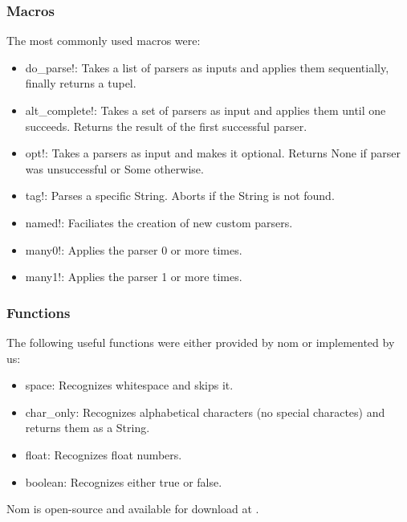 \documentclass[11pt,singlecolumn]{scrartcl}
\begin{document}
\subsubsection{Macros}
The most commonly used macros were:
\begin{itemize} 
\item do\_parse!: Takes a list of parsers as inputs and applies them sequentially, finally returns a tupel.
\item alt\_complete!: Takes a set of parsers as input and applies them until one succeeds. Returns the result of the first successful parser.
\item opt!: Takes a parsers as input and makes it optional. Returns None if parser was unsuccessful or Some otherwise.
\item tag!: Parses a specific String. Aborts if the String is not found.
\item named!: Faciliates the creation of new custom parsers.
\item many0!: Applies the parser 0 or more times.
\item many1!: Applies the parser 1 or more times. 
\end{itemize}
\subsubsection{Functions}
The following useful functions were either provided by nom or implemented by us:
\begin{itemize} 
\item space: Recognizes whitespace and skips it.
\item char\_only: Recognizes alphabetical characters (no special charactes) and returns them as a String.
\item float: Recognizes float numbers.
\item boolean: Recognizes either true or false.
\end{itemize}

Nom is open-source and available for download at \cite{GitNom}.

\clearpage

\end{document}

